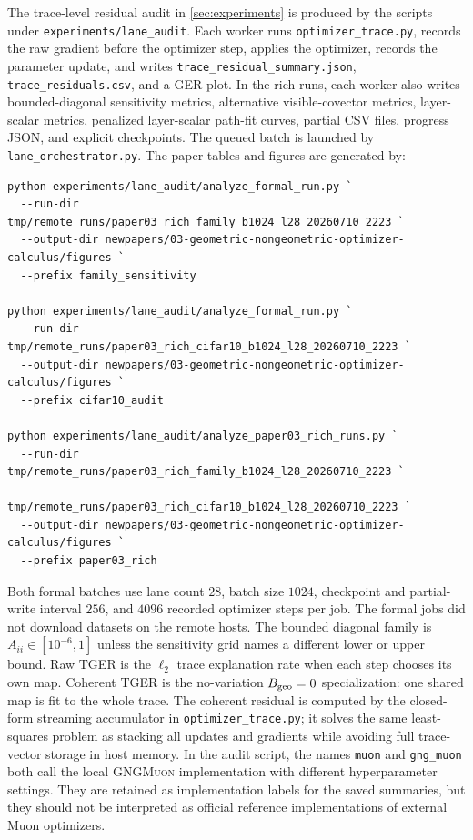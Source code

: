 The trace-level residual audit in \cref{sec:experiments} is produced
by the scripts under \texttt{experiments/lane\_audit}.  Each worker runs
\texttt{optimizer\_trace.py}, records the raw gradient before the optimizer
step, applies the optimizer, records the parameter update, and writes
\texttt{trace\_residual\_summary.json}, \texttt{trace\_residuals.csv}, and a
GER plot.  In the rich runs, each worker also writes bounded-diagonal
sensitivity metrics, alternative visible-covector metrics, layer-scalar
metrics, penalized layer-scalar path-fit curves, partial CSV files,
progress JSON, and explicit checkpoints.  The queued batch is launched by
\texttt{lane\_orchestrator.py}.  The paper tables and figures are generated
by:
\begin{verbatim}
python experiments/lane_audit/analyze_formal_run.py `
  --run-dir tmp/remote_runs/paper03_rich_family_b1024_l28_20260710_2223 `
  --output-dir newpapers/03-geometric-nongeometric-optimizer-calculus/figures `
  --prefix family_sensitivity

python experiments/lane_audit/analyze_formal_run.py `
  --run-dir tmp/remote_runs/paper03_rich_cifar10_b1024_l28_20260710_2223 `
  --output-dir newpapers/03-geometric-nongeometric-optimizer-calculus/figures `
  --prefix cifar10_audit

python experiments/lane_audit/analyze_paper03_rich_runs.py `
  --run-dir tmp/remote_runs/paper03_rich_family_b1024_l28_20260710_2223 `
            tmp/remote_runs/paper03_rich_cifar10_b1024_l28_20260710_2223 `
  --output-dir newpapers/03-geometric-nongeometric-optimizer-calculus/figures `
  --prefix paper03_rich
\end{verbatim}

Both formal batches use lane count $28$, batch size $1024$, checkpoint and
partial-write interval $256$, and $4096$ recorded optimizer steps per job.
The formal jobs did not download datasets on the remote hosts.  The bounded
diagonal family is $A_{ii}\in[10^{-6},1]$ unless the sensitivity grid names a
different lower or upper bound.  Raw TGER is the $\ell_2$ trace explanation
rate when each step chooses its own map.  Coherent TGER is the no-variation
$B_{\rm geo}=0$ specialization: one shared map is fit to the whole trace.  The
coherent residual is computed by the closed-form streaming accumulator in
\texttt{optimizer\_trace.py}; it solves the same least-squares problem as
stacking all updates and gradients while avoiding full trace-vector storage
in host memory.  In the audit script, the names \texttt{muon} and
\texttt{gng\_muon} both call the local \textsc{GNGMuon} implementation with
different hyperparameter settings.  They are retained as implementation
labels for the saved summaries, but they should not be interpreted as
official reference implementations of external Muon optimizers.


